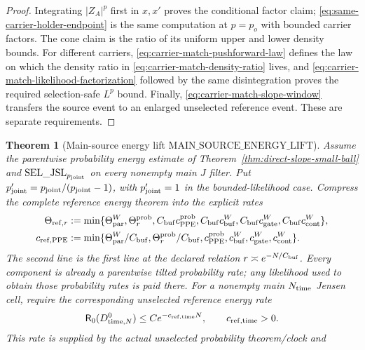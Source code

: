 \documentclass[11pt]{article}
\newtheorem{theorem}{Theorem}[section]
\begin{document}
\begin{proof}
Integrating $|Z_A|^p$ first in $x,x'$ proves the conditional factor claim;
\eqref{eq:same-carrier-holder-endpoint} is the same computation at
$p=p_o$ with bounded carrier factors.  The cone claim is the ratio of its
uniform upper and lower density bounds.  For different carriers,
\eqref{eq:carrier-match-pushforward-law} defines the law on which the density
ratio in \eqref{eq:carrier-match-density-ratio} lives, and
\eqref{eq:carrier-match-likelihood-factorization} followed by the same
disintegration proves the required selection-safe $L^p$ bound.  Finally,
\eqref{eq:carrier-match-slope-window} transfers the source event to an
enlarged unselected reference event.  These are separate requirements.
\end{proof}

\begin{theorem}[Main-source energy lift
$\mathrm{MAIN\_SOURCE\_ENERGY\_LIFT}$]
\label{thm:main-source-energy-lift}
Assume the parentwise probability energy estimate of
Theorem~\ref{thm:direct-slope-small-ball} and
$\mathrm{SEL\_JSL}_{p_{\rm joint}}$ on every nonempty main $J$ filter.  Put
$p_{\rm joint}'=p_{\rm joint}/(p_{\rm joint}-1)$, with
$p_{\rm joint}'=1$ in the bounded-likelihood case.  Compress the complete
reference energy theorem into the explicit rates
\begin{align}
 \Theta_{{\rm ref},r}:=\min\{&\Theta_{\rm par}^{W},
  \Theta_r^{\rm prob},C_{\rm buf}c_{\rm PPE}^{\rm prob},
  C_{\rm buf}c_{\rm buf}^{W},C_{\rm buf}c_{\rm gate}^{W},
  C_{\rm buf}c_{\rm cont}^{W}\},\notag\\
 c_{{\rm ref},{\rm PPE}}:=\min\{&\Theta_{\rm par}^{W}/C_{\rm buf},
  \Theta_r^{\rm prob}/C_{\rm buf},c_{\rm PPE}^{\rm prob},
  c_{\rm buf}^{W},c_{\rm gate}^{W},c_{\rm cont}^{W}\}.
 \label{eq:explicit-reference-energy-rates}
\end{align}
The second line is the first line at the declared relation
$r\asymp e^{-N/C_{\rm buf}}$.  Every component is already a parentwise
tilted probability rate; any likelihood used to obtain those probability
rates is paid there.  For a nonempty main $N_{\rm time}$ Jensen cell, require
the corresponding \emph{unselected} reference energy rate
\begin{equation}
\label{eq:unselected-time-reference-energy}
 \mathsf R_0(D_{{\rm time},N}^{0})
 \le Ce^{-c_{{\rm ref},{\rm time}}N},
 \qquad c_{{\rm ref},{\rm time}}>0.
\end{equation}
This rate is supplied by the actual unselected probability theorem/clock and

\end{theorem}
\end{document}
